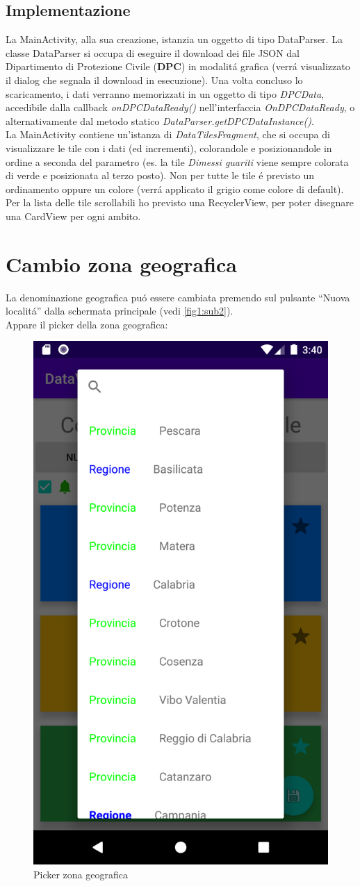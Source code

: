 \documentclass{article}
\newcommand{\quotes}[1]{``#1''}
\begin{document}
    \subsection{Implementazione}
    La MainActivity, alla sua creazione, istanzia un oggetto di tipo DataParser.
    La classe DataParser si occupa di eseguire il download dei file JSON dal Dipartimento di Protezione Civile (\textbf{DPC}) in modalitá grafica (verrá visualizzato il dialog che segnala il download in esecuzione).
    Una volta concluso lo scaricamento, i dati verranno memorizzati in un oggetto di tipo \emph{DPCData}, accedibile dalla callback \emph{onDPCDataReady()} nell'interfaccia \emph{OnDPCDataReady}, o alternativamente dal metodo statico \emph{DataParser.getDPCDataInstance()}.
    \\
    La MainActivity contiene un'istanza di \emph{DataTilesFragment}, che si occupa di visualizzare le tile con i dati (ed incrementi), colorandole e posizionandole in ordine a seconda del parametro 
    (es. la tile \emph{Dimessi guariti} viene sempre colorata di verde e posizionata al terzo posto). Non per tutte le tile é previsto un ordinamento oppure un colore (verrá applicato il grigio come colore di default).
    \\
    Per la lista delle tile scrollabili ho previsto una RecyclerView, per poter disegnare una CardView per ogni ambito.

    \section{Cambio zona geografica}
    La denominazione geografica puó essere cambiata premendo sul pulsante \quotes{Nuova localitá} dalla schermata principale (vedi \ref{fig1:sub2}).
    \\
    Appare il picker della zona geografica:

    \begin{figure}[h]
        \centering
        \includegraphics[width=.5\linewidth]{DPC_geo_picker.png}
        \caption{Picker zona geografica}
        \label{fig2}
    \end{figure}
\end{document}
